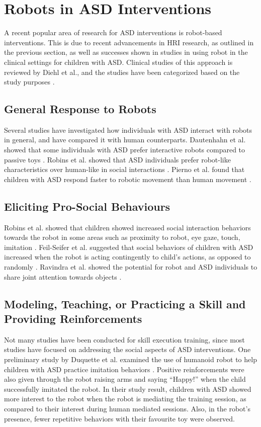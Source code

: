 \section{Robots in ASD Interventions}


A recent popular area of research for ASD interventions is robot-based interventions.  This is due to recent advancements in HRI research, as outlined in the previous section, as well as successes shown in studies in using robot in the clinical settings for children with ASD.  Clinical studies of this approach is reviewed by Diehl et al., and the studies have been categorized based on the study purposes \cite{diehl2012clinical}.


\subsection{General Response to Robots}
Several studies have investigated how individuals with ASD interact with robots in general, and have compared it with human counterparts.  Dautenhahn et al. showed that some individuals with ASD prefer interactive robots compared to passive toys \cite{dautenhahn2004towards}.  Robins et al. showed that ASD individuals prefer robot-like characteristics over human-like in social interactions \cite{robins2006does}.  Pierno et al. found that children with ASD respond faster to robotic movement than human movement \cite{pierno2008robotic}.


\subsection{Eliciting Pro-Social Behaviours}
Robins et al. showed that children showed increased social interaction behaviors towards the robot in some areas such as proximity to robot, eye gaze, touch, imitation \cite{robins2005robotic}.  Feil-Seifer et al. suggested that social behaviors of children with ASD increased when the robot is acting contingently to child's actions, as opposed to randomly \cite{feil2009toward}.  Ravindra et al. showed the potential for robot and ASD individuals to share joint attention towards objects \cite{ravindra2009therapeutic}.


\subsection{Modeling, Teaching, or Practicing a Skill and Providing Reinforcements}
Not many studies have been conducted for skill execution training, since most studies have focused on addressing the social aspects of ASD interventions.  One preliminary study by Duquette et al. examined the use of humanoid robot to help children with ASD practice imitation behaviors \cite{duquette2008exploring}.  Positive reinforcements were also given through the robot raising arms and saying ``Happy!'' when the child successfully imitated the robot.  In their study result, children with ASD showed more interest to the robot when the robot is mediating the training session, as compared to their interest during human mediated sessions.  Also, in the robot's presence, fewer repetitive behaviors with their favourite toy were observed.


